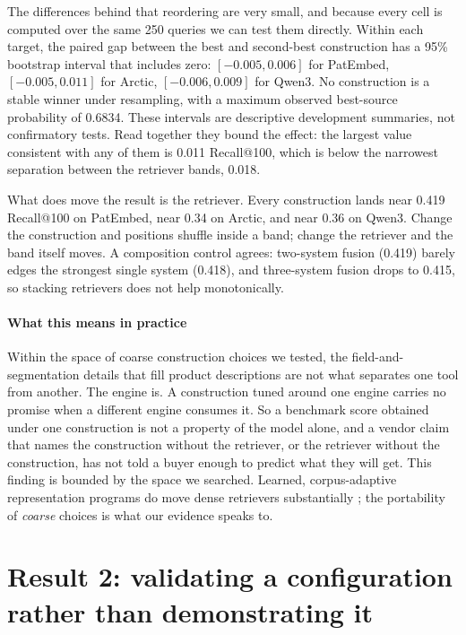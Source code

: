 \documentclass[preprint,11pt,authoryear]{elsarticle}          %
\begin{document}
The differences behind that reordering are very small, and because every cell is computed over the same 250 queries we can test them directly. Within each target, the paired gap between the best and second-best construction has a 95\% bootstrap interval that includes zero: $[-0.005, 0.006]$ for PatEmbed, $[-0.005, 0.011]$ for Arctic, $[-0.006, 0.009]$ for Qwen3. No construction is a stable winner under resampling, with a maximum observed best-source probability of 0.6834. These intervals are descriptive development summaries, not confirmatory tests. Read together they bound the effect: the largest value consistent with any of them is 0.011 Recall@100, which is below the narrowest separation between the retriever bands, 0.018.

What does move the result is the retriever. Every construction lands near 0.419 Recall@100 on PatEmbed, near 0.34 on Arctic, and near 0.36 on Qwen3. Change the construction and positions shuffle inside a band; change the retriever and the band itself moves. A composition control agrees: two-system fusion (0.419) barely edges the strongest single system (0.418), and three-system fusion drops to 0.415, so stacking retrievers does not help monotonically.

\paragraph{What this means in practice} Within the space of coarse construction choices we tested, the field-and-segmentation details that fill product descriptions are not what separates one tool from another. The engine is. A construction tuned around one engine carries no promise when a different engine consumes it. So a benchmark score obtained under one construction is not a property of the model alone, and a vendor claim that names the construction without the retriever, or the retriever without the construction, has not told a buyer enough to predict what they will get. This finding is bounded by the space we searched. Learned, corpus-adaptive representation programs do move dense retrievers substantially \citep{onuallain2026autoindex}; the portability of \emph{coarse} choices is what our evidence speaks to.

\section{Result 2: validating a configuration rather than demonstrating it}
\label{sec:confirmation}
\end{document}

